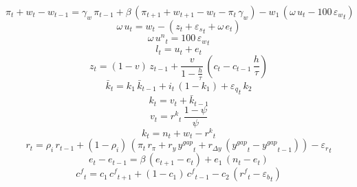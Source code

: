 \begin{dmath}
{{\pi}}_{t}+{{w}}_{t}-{{w}}_{t-1}={{\gamma_w}}\, {{\pi}}_{t-1}+{{\beta}}\, \left({{\pi}}_{t+1}+{{w}}_{t+1}-{{w}}_{t}-{{\pi}}_{t}\, {{\gamma_w}}\right)-{{w_1}}\, \left({{\omega}}\, {{u}}_{t}-100\, {{\varepsilon_w}}_{t}\right)
\end{dmath}
\begin{dmath}
{{\omega}}\, {{u}}_{t}={{w}}_{t}-\left({{z}}_{t}+{{\varepsilon_s}}_{t}+{{\omega}}\, {{e}}_{t}\right)
\end{dmath}
\begin{dmath}
{{\omega}}\, {{u^{n}}}_{t}=100\, {{\varepsilon_w}}_{t}
\end{dmath}
\begin{dmath}
{{l}}_{t}={{u}}_{t}+{{e}}_{t}
\end{dmath}
\begin{dmath}
{{z}}_{t}=\left(1-{{v}}\right)\, {{z}}_{t-1}+\frac{{{v}}}{1-\frac{{{h}}}{{{\tau}}}}\, \left({{c}}_{t}-{{c}}_{t-1}\, \frac{{{h}}}{{{\tau}}}\right)
\end{dmath}
\begin{dmath}
{{\bar{k}}}_{t}={{k_1}}\, {{\bar{k}}}_{t-1}+{{i}}_{t}\, \left(1-{{k_1}}\right)+{{\varepsilon_q}}_{t}\, {{k_2}}
\end{dmath}
\begin{dmath}
{{k}}_{t}={{v}}_{t}+{{\bar{k}}}_{t-1}
\end{dmath}
\begin{dmath}
{{v}}_{t}={{r^{k}}}_{t}\, \frac{1-{{\psi}}}{{{\psi}}}
\end{dmath}
\begin{dmath}
{{k}}_{t}={{n}}_{t}+{{w}}_{t}-{{r^{k}}}_{t}
\end{dmath}
\begin{dmath}
{{r}}_{t}={{\rho_{i}}}\, {{r}}_{t-1}+\left(1-{{\rho_{i}}}\right)\, \left({{\pi}}_{t}\, {{r_{\pi}}}+{{r_{y}}}\, {{y^{gap}}}_{t}+{{r_{\Delta y}}}\, \left({{y^{gap}}}_{t}-{{y^{gap}}}_{t-1}\right)\right)-{{\varepsilon_r}}_{t}
\end{dmath}
\begin{dmath}
{{e}}_{t}-{{e}}_{t-1}={{\beta}}\, \left({{e}}_{t+1}-{{e}}_{t}\right)+{{e_1}}\, \left({{n}}_{t}-{{e}}_{t}\right)
\end{dmath}
\begin{dmath}
{{c^{f}}}_{t}={{c_1}}\, {{c^{f}}}_{t+1}+\left(1-{{c_1}}\right)\, {{c^{f}}}_{t-1}-{{c_2}}\, \left({{r^{f}}}_{t}-{{\varepsilon_b}}_{t}\right)
\end{dmath}
